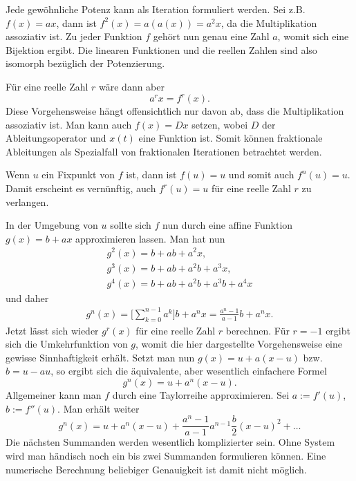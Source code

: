 \documentclass[a4paper,10pt,fleqn,twocolumn,twoside]{article}
\begin{document}
Jede gewöhnliche Potenz kann als Iteration formuliert werden.
Sei z.B. $f(x)=ax$, dann ist $f^2(x)=a(a(x))=a^2 x$, da die
Multiplikation assoziativ ist. Zu jeder Funktion $f$ gehört nun
genau eine Zahl $a$, womit sich eine Bijektion ergibt. Die
linearen Funktionen und die reellen Zahlen sind also isomorph
bezüglich der {\glqq}Potenzierung{\grqq}.

Für eine reelle Zahl $r$ wäre dann aber
\[a^r x = f^r(x).\]
Diese Vorgehensweise hängt offensichtlich nur davon ab, dass
die Multiplikation assoziativ ist. Man kann auch $f(x)=Dx$ setzen,
wobei $D$ der Ableitungsoperator und $x(t)$ eine Funktion ist.
Somit können fraktionale Ableitungen als Spezialfall von
fraktionalen Iterationen betrachtet werden.

Wenn $u$ ein Fixpunkt von $f$ ist, dann ist $f(u)=u$ und
somit auch $f^n(u)=u$. Damit erscheint es vernünftig, auch
$f^r(u)=u$ für eine reelle Zahl $r$ zu verlangen.

In der Umgebung von $u$ sollte sich $f$ nun durch eine
affine Funktion $g(x)=b+ax$ approximieren lassen. Man hat
nun
\begin{gather*}
g^2(x) = b+ab+a^2x,\\
g^3(x) = b+ab+a^2b+a^3x,\\
g^4(x) = b+ab+a^2b+a^3b+a^4x
\end{gather*}
und daher
\begin{gather*}
g^n(x) = \bigg[\sum_{k=0}^{n-1}a^k\bigg]b+a^nx
= \frac{a^n-1}{a-1}b+a^nx.
\end{gather*}
Jetzt lässt sich wieder $g^r(x)$ für eine reelle Zahl $r$
berechnen. Für $r=-1$ ergibt sich die Umkehrfunktion von $g$,
womit die hier dargestellte Vorgehensweise eine gewisse Sinnhaftigkeit
erhält. Setzt man nun $g(x)=u+a(x-u)$ bzw. $b=u-au$, so ergibt
sich die äquivalente, aber wesentlich einfachere Formel
\[g^n(x) = u+a^n(x-u).\]
Allgemeiner kann man $f$ durch eine Taylorreihe approximieren.
Sei $a:=f'(u)$, $b:=f''(u)$. Man erhält weiter
\[g^n(x) = u+a^n(x-u)
+\frac{a^n-1}{a-1}a^{n-1}\frac{b}{2}(x-u)^2+\ldots\]
Die nächsten Summanden werden wesentlich komplizierter sein. Ohne
System wird man händisch noch ein bis zwei Summanden formulieren
können. Eine numerische Berechnung beliebiger Genauigkeit ist damit
nicht möglich.
\end{document}
